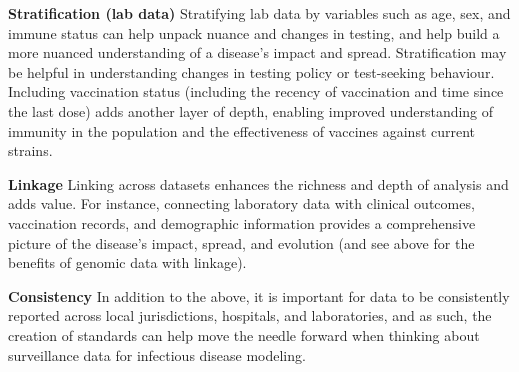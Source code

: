 {\bf Stratification (lab data)} Stratifying lab data by variables such as age, sex, and immune status can help unpack nuance and changes in testing, and help build a more nuanced understanding of a disease's impact and spread. Stratification may be helpful in understanding changes in testing policy or test-seeking behaviour. Including vaccination status (including the recency of vaccination and time since the last dose) adds another layer of depth, enabling improved understanding of immunity in the population and the effectiveness of vaccines against current strains.

{\bf Linkage} Linking across datasets enhances the richness and depth of analysis and adds value. For instance, connecting laboratory data with clinical outcomes, vaccination records, and demographic information provides a comprehensive picture of the disease's impact, spread, and evolution (and see above for the benefits of genomic data with linkage).  

{\bf Consistency} In addition to the above, it is important for data to be consistently reported across local jurisdictions, hospitals, and laboratories, and as such, the creation of standards can help move the needle forward when thinking about surveillance data for infectious disease modeling.


